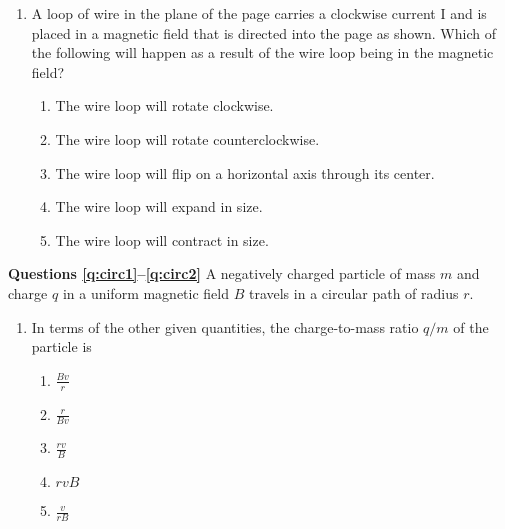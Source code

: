 \documentclass{../../../oss-classkick}
\begin{document}
\begin{multicols*}{2}
\begin{enumerate}[leftmargin=18pt,resume]
  \item A loop of wire in the plane of the page carries a clockwise current I
    and is placed in a magnetic field that is directed into the page as shown.
    Which of the following will happen as a result of the wire loop being in
    the magnetic field?
    \begin{center}
    \end{center}
    \begin{enumerate}[noitemsep,topsep=0pt,leftmargin=18pt,label=(\Alph*)]
    \item The wire loop will rotate clockwise.
    \item The wire loop will rotate counterclockwise.
    \item The wire loop will flip on a horizontal axis through its center.
    \item The wire loop will expand in size.
    \item The wire loop will contract in size.
    \end{enumerate}
    \vspace{.7in}
  \end{enumerate}

  \textbf{Questions \ref{q:circ1}--\ref{q:circ2}}
  A negatively charged particle of mass $m$ and charge $q$ in a uniform magnetic
  field $B$ travels in a circular path of radius $r$.
  \begin{center}
  \end{center}
  \begin{enumerate}[leftmargin=18pt,resume]
  \item In terms of the other given quantities, the charge-to-mass ratio $q/m$
    of the particle is
    \begin{enumerate}[nosep,leftmargin=18pt,label=(\Alph*)]
    \item $\displaystyle\frac{Bv}{r}$
    \item $\displaystyle\frac{r}{Bv}$
    \item $\displaystyle\frac{rv}{B}$
    \item $rvB$
    \item $\displaystyle\frac{v}{rB}$
    \end{enumerate}
    \label{q:circ1}
    

\end{enumerate}
\end{multicols*}
\end{document}
